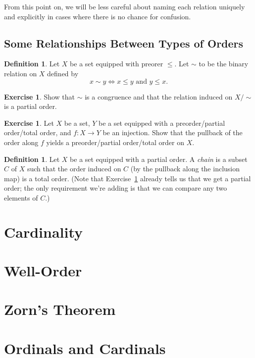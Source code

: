 \documentclass[letterpaper]{article}
\theoremstyle{definition}
\newtheorem{definition}[theorem]{Definition}
\newtheorem{exercise}[theorem]{Exercise}
\newcommand{\defterm}{\emph}
\begin{document}
From this point on, we will be less careful about naming each relation
uniquely and explicitly in cases where there is no chance for
confusion.

\subsection{Some Relationships Between Types of Orders}

\begin{definition}
  Let \(X\) be a set equipped with preorer \(\leq\).  Let \(\sim\) to
  be the binary relation on \(X\) defined by
  \[x \sim y \iff x \leq y \text{ and } y \leq x \text{.}\]
\end{definition}

\begin{exercise}
  Show that \(\sim\) is a congruence and that the relation induced on
  \(X/{\sim}\) is a partial order.
\end{exercise}

\begin{exercise}\label{exercise:pullback-order-injection}
  Let \(X\) be a set, \(Y\) be a set equipped with a preorder/partial
  order/total order, and \(f:X \to Y\) be an injection.  Show that the
  pullback of the order along \(f\) yields a preorder/partial
  order/total order on \(X\).
\end{exercise}

\begin{definition}
  Let \(X\) be a set equipped with a partial order.  A \defterm{chain}
  is a subset \(C\) of \(X\) such that the order induced on \(C\) (by
  the pullback along the inclusion map) is a total order.  (Note that
  Exercise~\ref{exercise:pullback-order-injection} already tells us
  that we get a partial order; the only requirement we're adding is
  that we can compare any two elements of \(C\).)
\end{definition}

\section{Cardinality}

\section{Well-Order}

\section{Zorn's Theorem}

\section{Ordinals and Cardinals}
\end{document}
